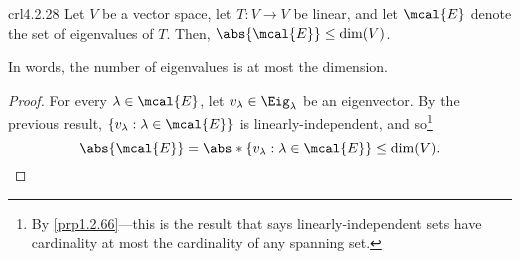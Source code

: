 \begin{crl}{}{crl4.2.28}
	Let $V$ be a vector space, let $T\colon V\rightarrow V$ be linear, and let $\mcal{E}$ denote the set of eigenvalues of $T$.  Then, $\abs{\mcal{E}}\leq \dim (V)$.
	\begin{rmk}
		In words, the number of eigenvalues is at most the dimension.
	\end{rmk}
	\begin{proof}
		For every $\lambda \in \mcal{E}$, let $v_{\lambda}\in \Eig _{\lambda}$ be an eigenvector.  By the previous result, $\{ v_{\lambda}:\lambda \in \mcal{E}\}$ is linearly-independent, and so\footnote{By \cref{prp1.2.66}---this is the result that says linearly-independent sets have cardinality at most the cardinality of any spanning set.}
		\begin{equation}
			\abs{\mcal{E}}=\abs*{\{ v_{\lambda}:\lambda \in \mcal{E}\}}\leq \dim (V).
		\end{equation}
	\end{proof}
\end{crl}

